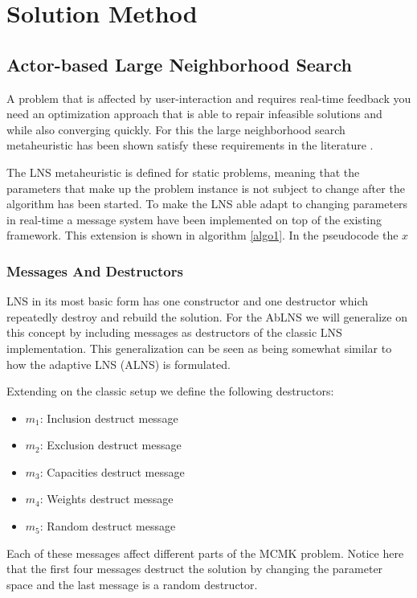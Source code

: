 \documentclass[preprint,12pt,authoryear]{elsarticle}
\begin{document}
\section{Solution Method}
\label{sec:2-solution-method}

\subsection{Actor-based Large Neighborhood Search}
A problem that is affected by user-interaction and requires real-time feedback you need an optimization approach that is able to repair infeasible solutions and while also 
converging quickly. For this the large neighborhood search metaheuristic has been shown satisfy these requirements in the literature \cite{gendreau_handbook_2019}. 

The LNS metaheuristic is defined for static problems, meaning that the parameters that make up the problem instance is not subject to change 
after the algorithm has been started. To make the LNS able adapt to changing parameters in real-time a message system have been implemented on top of the existing framework. This 
extension is shown in algorithm \ref{algo1}. In the pseudocode the $x$ 

\subsubsection{Messages And Destructors}
LNS in its most basic form has one constructor and one destructor which repeatedly destroy and rebuild the solution. For the AbLNS we will generalize on this concept by 
including messages as destructors of the classic LNS implementation. This generalization can be seen as being somewhat similar to how the adaptive LNS (ALNS) is formulated. 

Extending on the classic setup we define the following destructors:

\begin{itemize}
	\item $m_1$: Inclusion destruct message	
	\item $m_2$: Exclusion destruct message	
	\item $m_3$: Capacities destruct message	
	\item $m_4$: Weights destruct message	
	\item $m_5$: Random destruct message
\end{itemize}

Each of these messages affect different parts of the MCMK problem. Notice
here that the first four messages destruct the solution by changing the parameter space and the last message is 
a random destructor.
\end{document}
